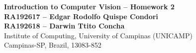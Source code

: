 \documentclass[10pt, a4paper]{article}
\begin{document}
\begin{center}

\textbf{Introduction to Computer Vision -- Homework 2} \\[0.1cm]

\textbf{RA192617 -- Edgar Rodolfo Quispe Condori} \\[0.1cm]
\textbf{RA192618 -- Darwin Ttito Concha} \\[0.1cm]

Institute of Computing, University of Campinas (UNICAMP) \\
Campinas-SP, Brazil, 13083-852 \\
\end{center}
%




%
\end{document}
